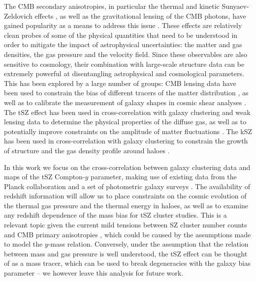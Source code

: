 \documentclass[useAMS,usenatbib]{mn2e}
\begin{document}
  The CMB secondary anisotropies, in particular the thermal and kinetic Sunyaev-Zeldovich effects \citep[tSZ and kSZ respectively,][]{1972CoASP...4..173S}, as well as the gravitational lensing of the CMB photons, have gained popularity as a means to address this issue \citep{2017JCAP...11..040B,2019BAAS...51c.297B}. These effects are relatively clean probes of some of the physical quantities that need to be understood in order to mitigate the impact of astrophysical uncertainties: the matter and gas densities, the gas pressure and the velocity field. Since these observables are also sensitive to cosmology, their combination with large-scale structure data can be extremely powerful at disentangling astrophysical and cosmological parameters. This has been explored by a large number of groups: CMB lensing data have been used to constrain the bias of different tracers of the matter distribution \citep[e.g.][]{2019MNRAS.485.1720H,2018JCAP...04..053A,2018arXiv181002322A,2018MNRAS.481.1133P}, as well as to calibrate the measurement of galaxy shapes in cosmic shear analyses \citep{2017PhRvD..95l3512S}. The tSZ effect has been used in cross-correlation with galaxy clustering and weak lensing data to determine the physical properties of the diffuse gas, as well as to potentially improve constraints on the amplitude of matter fluctuations \citep{2014PhRvD..89b3508V,2014JCAP...02..030H,2015JCAP...09..046M,2017MNRAS.471.1565H,2017ApJ...845...71A,2018PhRvD..97f3514A,2018MNRAS.480.3928M,2019A&A...624A..48D,2019MNRAS.483..223T,2019arXiv190306654T,2019arXiv190413347P,2019arXiv190707870M}. The kSZ has been used in cross-correlation with galaxy clustering to constrain the growth of structure and the gas density profile around haloes \citep{2016PhRvD..93h2002S,2016A&A...586A.140P,2016PhRvL.117e1301H,2016MNRAS.461.3172S,2017JCAP...03..008D}.
  
  In this work we focus on the cross-correlation between galaxy clustering data and maps of the tSZ Compton-$y$ parameter, making use of existing data from the Planck collaboration \citep{2016A&A...594A..22P} and a set of photometric galaxy surveys \citep{2014ApJS..210....9B,2016ApJS..225....5B}. The availability of redshift information will allow us to place constraints on the cosmic evolution of the thermal gas pressure and the thermal energy in haloes, as well as to examine any redshift dependence of the mass bias for tSZ cluster studies. This is a relevant topic given the current mild tensions between SZ cluster number counts and CMB primary anisotropies \citep{2016A&A...594A..24P,2016ApJ...832...95D,2019ApJ...878...55B,2019arXiv190407887Z}, which could be caused by the assumptions made to model the $y$-mass relation. Conversely, under the assumption that the relation between mass and gas pressure is well understood, the tSZ effect can be thought of as a mass tracer, which can be used to break degeneracies with the galaxy bias parameter -- we however leave this analysis for future work.
\end{document}
